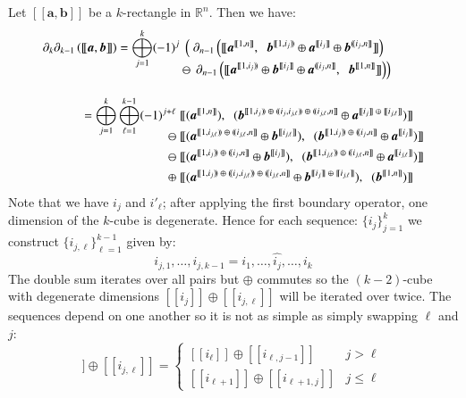 Let $[\![\boldsymbol{a}, \boldsymbol{b}]\!]$ be a $k$-rectangle in $\mathbb{R}^n$.
Then we have:
\begin{align}
	\partial_k \partial_{k-1} \left( [\![ \boldsymbol{a}, \boldsymbol{b} ]\!] \right) 
	= \bigoplus_{j=1}^k (-1)^j 
		& \;  \left( \; \partial_{n-1} \left(	
			[\![ 	\boldsymbol{a}^{[\![1,n]\!]}, \;\;
				\boldsymbol{b}^{[\![1,i_j)\!)}
					\oplus \boldsymbol{a}^{[\![i_j]\!]}
					\oplus \boldsymbol{b}^{(\!(i_j,n]\!]} 
			]\!] 
		\right) \right. \notag\\[-1em]
		& \ominus \; \left. \! \partial_{n-1} \left(
			[\![ 	\boldsymbol{a}^{[\![1,i_j)\!)}
					\oplus \boldsymbol{b}^{[\![i_j]\!]}
					\oplus \boldsymbol{a}^{(\!(i_j,n]\!]} , \;\;
				\boldsymbol{b}^{[\![1,n]\!]}
			]\!] 
		\right)\right) \\[1em]
	= \bigoplus_{j=1}^k \bigoplus_{\ell=1}^{k-1} (-1)^{j+\ell}
		\;&
			[\![ 	(\boldsymbol{a}^{[\![1,n]\!]}), \;\;
				(\boldsymbol{b}^{[\![1,i_j)\!) \;\oplus\; (\!(i_j,i_{j,\ell})\!) \;\oplus\; (\!(i_{j,\ell},n]\!]}
					\oplus \boldsymbol{a}^{[\![i_j]\!] \;\oplus\; [\![i_{j,\ell}]\!]})
			]\!] \notag\\[-1em]
		\ominus \;&
			[\![ 	(\boldsymbol{a}^{[\![1,i_{j,\ell})\!) \;\oplus\; (\!(i_{j,\ell},n]\!]}
					\oplus \boldsymbol{b}^{[\![i_{j,\ell}]\!]}), \;\;
				(\boldsymbol{b}^{[\![1,i_j)\!) \;\oplus\; (\!(i_j,n]\!]}
					\oplus \boldsymbol{a}^{[\![i_j]\!]})
			]\!] \notag\\
		\ominus \; &
			[\![ 	(\boldsymbol{a}^{[\![1,i_j)\!) \;\oplus\; (\!(i_j,n]\!]}
					\oplus \boldsymbol{b}^{[\![i_j]\!]}), \;\;
				(\boldsymbol{b}^{[\![1,i_{j,\ell})\!) \;\oplus\; (\!(i_{j,\ell},n]\!]}
					\oplus \boldsymbol{a}^{[\![i_{j,\ell}]\!]})
			]\!] \notag\\
		\oplus \;&
			[\![ 	(\boldsymbol{a}^{[\![1,i_j)\!) \;\oplus\; (\!(i_j,i_{j,\ell})\!) \;\oplus\; (\!(i_{j,\ell},n]\!]}
					\oplus \boldsymbol{b}^{[\![i_j]\!] \;\oplus\; [\![i_{j,\ell}]\!]}), \;\;
				(\boldsymbol{b}^{[\![1,n]\!]})
			]\!] 
\end{align}
Note that we have $i_j$ and $i'_\ell$; after applying the first boundary operator, one dimension of the $k$-cube is degenerate.
Hence for each sequence: $\{i_j\}_{j=1}^k$ we construct $\{i_{j,\ell}\}_{\ell=1}^{k-1}$ given by:
\begin{equation}
	i_{j,1} , \ldots, i_{j,k-1} = i_1, \ldots, \widehat{i_j}, \ldots, i_k
\end{equation}
The double sum iterates over all pairs but $\oplus$ commutes so the $(k-2)$-cube with degenerate dimensions $[\![i_j]\!] \oplus [\![i_{j,\ell}]\!]$ will be iterated over twice. 
The sequences depend on one another so it is not as simple as simply swapping $\ell$ and $j$:
\begin{equation}
   [\![i_j]\!] \oplus [\![i_{j,\ell}]\!] =
     \begin{cases}
       [\![i_\ell]\!] \oplus [\![i_{\ell,j-1}]\!] & j > \ell \\
       [\![i_{\ell+1}]\!] \oplus [\![i_{\ell+1,j}]\!] & j \leq \ell
     \end{cases}
\end{equation}


